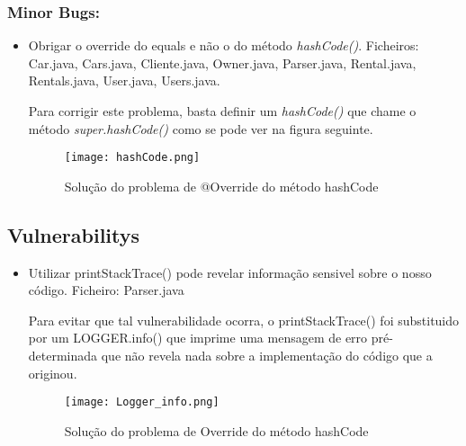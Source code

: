 \subsubsection{Minor Bugs:}
\begin{itemize}
\item Obrigar o override do equals e não o do método \textit{hashCode()}.\newline
 Ficheiros: Car.java, Cars.java, Cliente.java, Owner.java, Parser.java, Rental.java, Rentals.java, User.java, Users.java.\newline


\par Para corrigir este problema, basta definir um \textit{hashCode()} que chame o método \textit{super.hashCode()} como se pode ver na figura seguinte.

\begin{figure}[H]

  \centering

  \texttt{[image: hashCode.png]}

  \caption {Solução do problema de @Override do método hashCode}

  \label {fig08}

\end{figure}

\end{itemize}


\subsection{Vulnerabilitys}
\begin{itemize}
\item Utilizar printStackTrace() pode revelar informação sensivel sobre o nosso código.\newline
 Ficheiro: Parser.java\newline

 \par Para evitar que tal vulnerabilidade ocorra, o printStackTrace() foi substituido por um LOGGER.info() que imprime uma mensagem de erro pré-determinada que não revela nada sobre a implementação do código que a originou.
 \begin{figure}[H]

  \centering

  \texttt{[image: Logger\_info.png]}

  \caption {Solução do problema de Override do método hashCode}

  \label {fig09}

\end{figure}

\end{itemize}

